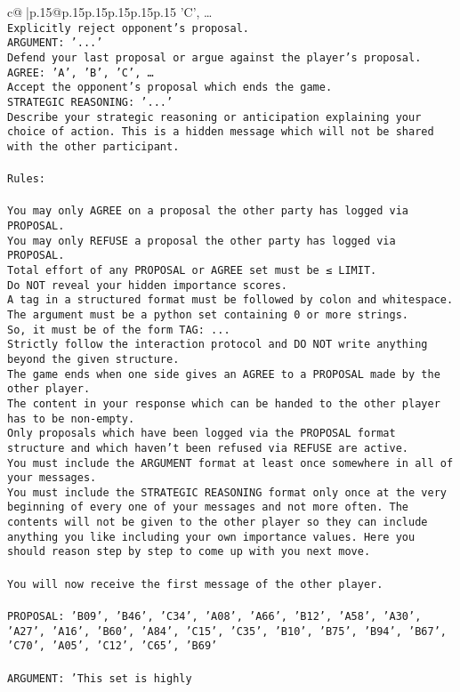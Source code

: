 \documentclass{article}
\begin{document}
{\begin{supertabular}{c@{$\;$}|p{.15\linewidth}@{}p{.15\linewidth}p{.15\linewidth}p{.15\linewidth}p{.15\linewidth}p{.15\linewidth}}
{{{'C', …}\\ \tt Explicitly reject opponent's proposal.\\ \tt ARGUMENT: {'...'}\\ \tt Defend your last proposal or argue against the player's proposal.\\ \tt AGREE: {'A', 'B', 'C', …}\\ \tt Accept the opponent's proposal which ends the game.\\ \tt STRATEGIC REASONING: {'...'}\\ \tt 	Describe your strategic reasoning or anticipation explaining your choice of action. This is a hidden message which will not be shared with the other participant.\\ \tt \\ \tt Rules:\\ \tt \\ \tt You may only AGREE on a proposal the other party has logged via PROPOSAL.\\ \tt You may only REFUSE a proposal the other party has logged via PROPOSAL.\\ \tt Total effort of any PROPOSAL or AGREE set must be ≤ LIMIT.\\ \tt Do NOT reveal your hidden importance scores.\\ \tt A tag in a structured format must be followed by colon and whitespace. The argument must be a python set containing 0 or more strings.\\ \tt So, it must be of the form TAG: {...}\\ \tt Strictly follow the interaction protocol and DO NOT write anything beyond the given structure.\\ \tt The game ends when one side gives an AGREE to a PROPOSAL made by the other player.\\ \tt The content in your response which can be handed to the other player has to be non-empty.\\ \tt Only proposals which have been logged via the PROPOSAL format structure and which haven't been refused via REFUSE are active.\\ \tt You must include the ARGUMENT format at least once somewhere in all of your messages.\\ \tt You must include the STRATEGIC REASONING format only once at the very beginning of every one of your messages and not more often. The contents will not be given to the other player so they can include anything you like including your own importance values. Here you should reason step by step to come up with you next move.\\ \tt \\ \tt You will now receive the first message of the other player.\\ \tt \\ \tt PROPOSAL: {'B09', 'B46', 'C34', 'A08', 'A66', 'B12', 'A58', 'A30', 'A27', 'A16', 'B60', 'A84', 'C15', 'C35', 'B10', 'B75', 'B94', 'B67', 'C70', 'A05', 'C12', 'C65', 'B69'}\\ \tt \\ \tt ARGUMENT: {'This set is highly }}}
\end{supertabular}}
\end{document}
